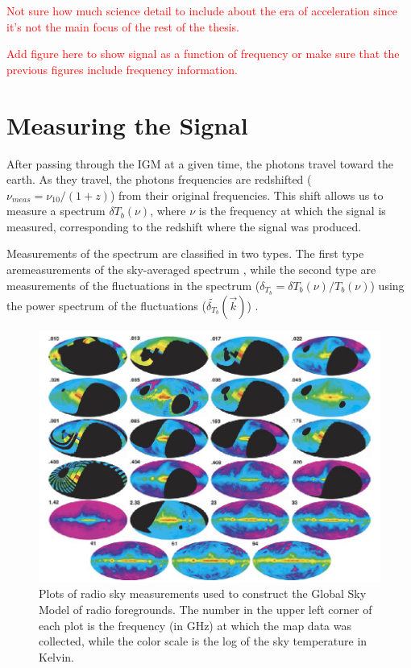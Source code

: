 \textcolor{red}{Not sure how much science detail to include about the era of acceleration since it's not the main focus of the rest of the thesis.}

\textcolor{red}{Add figure here to show \cm signal as a function of frequency or make sure that the previous figures include frequency information.}

\section{Measuring the \cm Signal}
After passing through the IGM at a given time, the \cm photons travel toward the earth. As they travel, the photons frequencies are redshifted ($\nu_{meas} = \nu_{10}/(1+z)$) from their original frequencies. This shift allows us to measure a spectrum $\delta T_b (\nu)$, where $\nu$ is the frequency at which the signal is measured, corresponding to the redshift where the signal was produced. 

Measurements of the \cm spectrum are classified in two types. The first type aremeasurements of the sky-averaged spectrum \avgdtb, while the second type are measurements of the fluctuations in the \cm spectrum ($\delta_{T_b} =  \delta T_b (\nu)/ T_b (\nu)$) using the power spectrum of the fluctuations ($ \tilde{ \delta_{T_b} } ( \vec{k} )$) \cite{natarajan_2014}. 

\begin{figure}[htb]
\begin{center}
\includegraphics[width=0.95\linewidth]{Introduction/figures/GSM_maps.jpg}
\caption{Plots of radio sky measurements used to construct the Global Sky Model \cite{GSM_model} of radio foregrounds. The number in the upper left corner of each plot is the frequency (in GHz) at which the map data was collected, while the color scale is the log of the sky temperature in Kelvin.}
\label{Fig:GSM_maps}
\end{center}
\end{figure}

